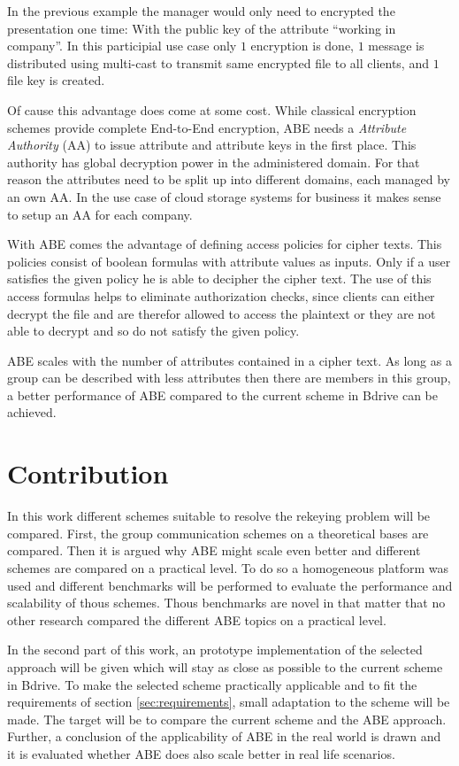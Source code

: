In the previous example the manager would only need to encrypted the presentation one time: With the public key of the attribute “working in company”. In this participial use case only $1$ encryption is done, $1$ message is distributed using multi-cast to transmit same encrypted file to all clients, and $1$ file key is created. 

Of cause this advantage does come at some cost. While classical encryption schemes provide complete End-to-End encryption, ABE needs a \textit{Attribute Authority} (\ac{AA}) to issue attribute and attribute keys in the first place. This authority has global decryption power in the administered domain. For that reason the attributes need to be split up into different domains, each managed by an own AA. In the use case of cloud storage systems for business it makes sense to setup an AA for each company. 

With ABE comes the advantage of defining access policies for cipher texts. This policies consist of boolean formulas with attribute values as inputs. Only if a user satisfies the given policy he is able to decipher the cipher text. The use of this access formulas helps to eliminate authorization checks, since clients can either decrypt the file and are therefor allowed to access the plaintext or they are not able to decrypt and so do not satisfy the given policy. 


ABE scales with the number of attributes contained in a cipher text. As long as a group can be described with less attributes then there are members in this group, a better performance of ABE compared to the current scheme in Bdrive can be achieved. 

\section{Contribution}
In this work different schemes suitable to resolve the rekeying problem will be compared. First, the group communication schemes on a theoretical bases are compared. Then it is argued why ABE might scale even better and different schemes are compared on a practical level. To do so a homogeneous platform was used and different benchmarks will be performed to evaluate the performance and scalability of thous schemes. Thous benchmarks are novel in that matter that no other research compared the different ABE topics on a practical level.  

In the second part of this work, an prototype implementation of the selected approach will be given which will stay as close as possible to the current scheme in Bdrive. To make the selected scheme practically applicable and to fit the requirements of section \ref{sec:requirements}, small adaptation to the scheme will be made. The target will be to compare the current scheme and the ABE approach. Further, a conclusion of the applicability of ABE in the real world is drawn and it is evaluated whether ABE does also scale better in real life scenarios. 